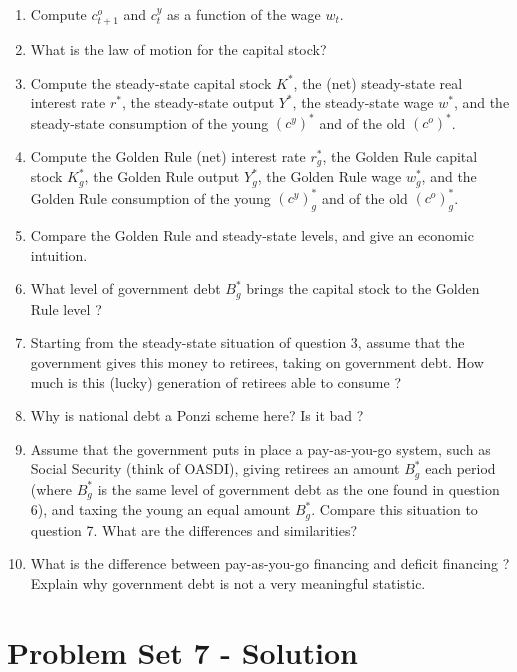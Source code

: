 \documentclass[]{book}
\theoremstyle{definition}
\theoremstyle{definition}
\theoremstyle{definition}
\theoremstyle{remark}
\begin{document}
\begin{enumerate}
\def\labelenumi{\arabic{enumi}.}
\item
  Compute \(c_{t+1}^o\) and \(c_t^y\) as a function of the wage \(w_t\).
\item
  What is the law of motion for the capital stock?
\item
  Compute the steady-state capital stock \(K^{*}\), the (net)
  steady-state real interest rate \(r^{*}\), the steady-state output
  \(Y^{*}\), the steady-state wage \(w^{*}\), and the steady-state
  consumption of the young \((c^y)^{*}\) and of the old \((c^o)^{*}\).
\item
  Compute the Golden Rule (net) interest rate \(r^{*}_g\), the Golden
  Rule capital stock \(K^{*}_g\), the Golden Rule output \(Y^{*}_g\),
  the Golden Rule wage \(w^{*}_g\), and the Golden Rule consumption of
  the young \((c^y)^{*}_g\) and of the old \((c^o)^{*}_g\).
\item
  Compare the Golden Rule and steady-state levels, and give an economic
  intuition.
\item
  What level of government debt \(B^{*}_g\) brings the capital stock to
  the Golden Rule level ?
\item
  Starting from the steady-state situation of question 3, assume that
  the government gives this money to retirees, taking on government
  debt. How much is this (lucky) generation of retirees able to consume
  ?
\item
  Why is national debt a Ponzi scheme here? Is it bad ?
\item
  Assume that the government puts in place a pay-as-you-go system, such
  as Social Security (think of OASDI), giving retirees an amount
  \(B^{*}_g\) each period (where \(B^{*}_g\) is the same level of
  government debt as the one found in question 6), and taxing the young
  an equal amount \(B^{*}_g\). Compare this situation to question 7.
  What are the differences and similarities?
\item
  What is the difference between pay-as-you-go financing and deficit
  financing ? Explain why government debt is not a very meaningful
  statistic.
\end{enumerate}

\chapter*{Problem Set 7 - Solution}\label{problem-set-7---solution}
\end{document}
